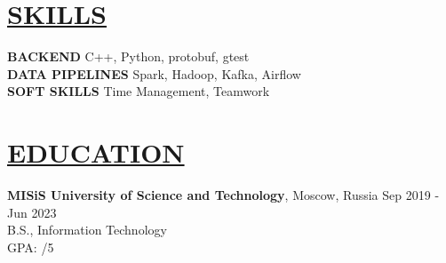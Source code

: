\documentclass{resume} %
\begin{document}
\begin{multicols}{2}
    \begin{minipage}{\linewidth}
        \section*{\uline{SKILLS \hfill}}
        {\bf BACKEND} \hfill C++, Python, protobuf, gtest \\
        {\bf DATA PIPELINES} \hfill Spark, Hadoop, Kafka, Airflow \\
        {\bf SOFT SKILLS} \hfill Time Management, Teamwork \\
    \end{minipage}

    \begin{minipage}{\linewidth}
        \section*{\uline{EDUCATION \hfill}}
        {\bf MISiS University of Science and Technology}, Moscow, Russia \hfill {Sep 2019 - Jun 2023}\\
        B.S., Information Technology\\
        GPA: /5\\
    \end{minipage}
\end{multicols}
\end{document}
